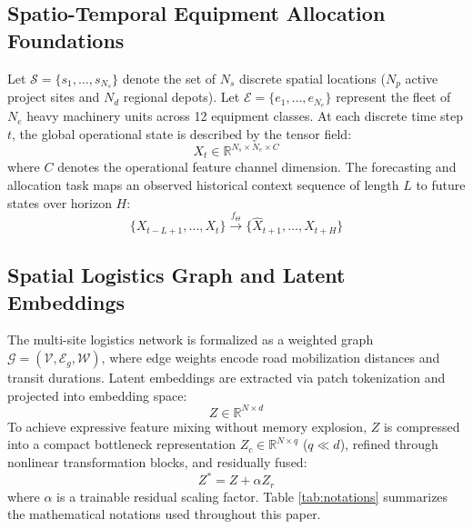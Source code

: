 \documentclass[11pt,a4paper]{article}
\begin{document}
\subsection{Spatio-Temporal Equipment Allocation Foundations}
Let $\mathcal{S} = \{s_1, \dots, s_{N_s}\}$ denote the set of $N_s$ discrete spatial locations ($N_p$ active project sites and $N_d$ regional depots). Let $\mathcal{E} = \{e_1, \dots, e_{N_e}\}$ represent the fleet of $N_e$ heavy machinery units across 12 equipment classes. At each discrete time step $t$, the global operational state is described by the tensor field:
\begin{equation}
X_t \in \mathbb{R}^{N_s \times N_e \times C} \label{eq:tensor}
\end{equation}
where $C$ denotes the operational feature channel dimension. The forecasting and allocation task maps an observed historical context sequence of length $L$ to future states over horizon $H$:
\begin{equation}
\{X_{t-L+1}, \dots, X_t\} \xrightarrow{f_\Theta} \{\widehat{X}_{t+1}, \dots, \widehat{X}_{t+H}\} \label{eq:mapping}
\end{equation}

\subsection{Spatial Logistics Graph and Latent Embeddings}
The multi-site logistics network is formalized as a weighted graph $\mathcal{G} = (\mathcal{V}, \mathcal{E}_g, \mathcal{W})$, where edge weights encode road mobilization distances and transit durations. Latent embeddings are extracted via patch tokenization and projected into embedding space:
\begin{equation}
Z \in \mathbb{R}^{N \times d} \label{eq:latent}
\end{equation}
To achieve expressive feature mixing without memory explosion, $Z$ is compressed into a compact bottleneck representation $Z_c \in \mathbb{R}^{N \times q}$ ($q \ll d$), refined through nonlinear transformation blocks, and residually fused:
\begin{equation}
Z^* = Z + \alpha Z_r \label{eq:fusion}
\end{equation}
where $\alpha$ is a trainable residual scaling factor. Table \ref{tab:notations} summarizes the mathematical notations used throughout this paper.
\end{document}
